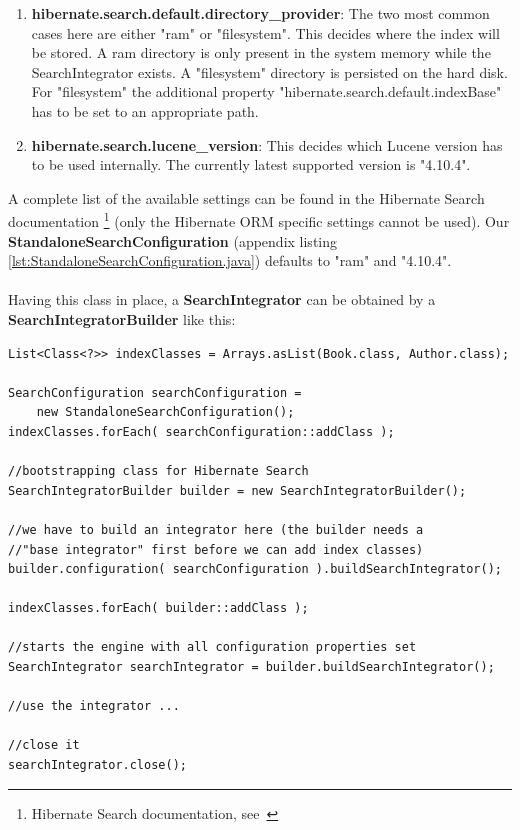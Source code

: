 \begin{enumerate}
	\item \textbf{hibernate.search.default.directory\_provider}: The two most common cases here are either "ram" or "filesystem". This decides where the index will be stored. A ram directory is only present in the system memory while the SearchIntegrator exists. A "filesystem" directory is persisted on the hard disk. For "filesystem" the additional property "hibernate.search.default.indexBase" has to be set to an appropriate path.
	
	\item \textbf{hibernate.search.lucene\_version}: This decides which Lucene version has to be used internally. The currently latest supported version is "4.10.4".
\end{enumerate}
\noindent
A complete list of the available settings can be found in the Hibernate Search documentation \footnote{Hibernate Search documentation, see~\cite{hibernate_search_doc}} (only the Hibernate ORM specific settings cannot be used). Our \textbf{StandaloneSearchConfiguration} (appendix listing \ref{lst:StandaloneSearchConfiguration.java}) defaults to "ram" and "4.10.4".
\\\\
Having this class in place, a \textbf{SearchIntegrator} can be obtained by a \textbf{SearchIntegratorBuilder} like this:
\\
\lstset{language=java}
\begin{lstlisting}[frame=htrbl, caption={Starting up the engine}, label={lst:starting_up_engine.java}]
List<Class<?>> indexClasses = Arrays.asList(Book.class, Author.class);

SearchConfiguration searchConfiguration = 
	new StandaloneSearchConfiguration();
indexClasses.forEach( searchConfiguration::addClass );

//bootstrapping class for Hibernate Search
SearchIntegratorBuilder builder = new SearchIntegratorBuilder();

//we have to build an integrator here (the builder needs a 
//"base integrator" first before we can add index classes)
builder.configuration( searchConfiguration ).buildSearchIntegrator();

indexClasses.forEach( builder::addClass );

//starts the engine with all configuration properties set
SearchIntegrator searchIntegrator = builder.buildSearchIntegrator();

//use the integrator ...

//close it
searchIntegrator.close();
\end{lstlisting}

